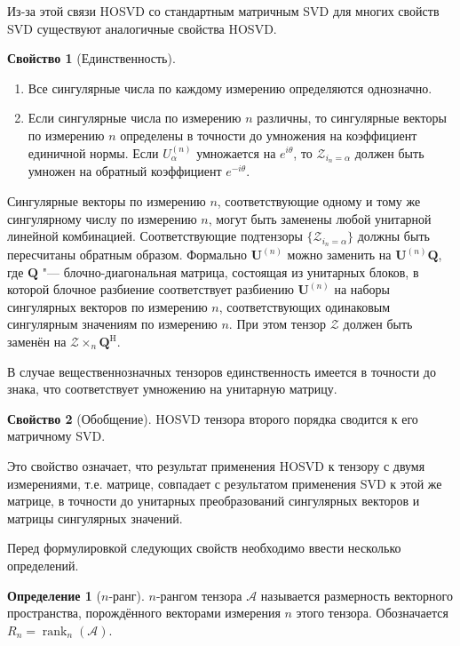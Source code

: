 \documentclass[specialist,
    substylefile = spbu_report.rtx,
    subf,href,colorlinks=true, 12pt]{disser}
\theoremstyle{plain}
\theoremstyle{definition}
\newtheorem{definition}{Определение}[section]
\newtheorem{property}{Свойство}[section]
\theoremstyle{remark}
\begin{document}
    Из-за этой связи HOSVD со стандартным матричным SVD для многих свойств SVD существуют аналогичные свойства HOSVD\@.
    \begin{property}[Единственность]
        \leavevmode
        \begin{enumerate}
            \item Все сингулярные числа по каждому измерению определяются однозначно.
            \item Если сингулярные числа по измерению $n$ различны, то сингулярные векторы по измерению $n$ определены
            в точности до умножения на коэффициент единичной нормы.
            Если $U_\alpha^{(n)}$ умножается на $e^{i\theta}$, то $\mathcal{Z}_{i_n=\alpha}$ должен быть умножен на обратный
            коэффициент $e^{-i\theta}$.
        \end{enumerate}
        Сингулярные векторы по измерению $n$, соответствующие одному и тому же сингулярному числу по измерению $n$,
        могут быть заменены любой унитарной линейной комбинацией.
        Соответствующие подтензоры $\{\mathcal{Z}_{i_n=\alpha}\}$ должны быть пересчитаны обратным образом.
        Формально $\mathbf{U}^{(n)}$ можно заменить на $\mathbf{U}^{(n)}\mathbf{Q}$, где $\mathbf{Q}$ "--- блочно-диагональная
        матрица, состоящая из унитарных блоков, в которой блочное разбиение соответствует разбиению $\mathbf{U}^{(n)}$
        на наборы сингулярных векторов по измерению $n$, соответствующих одинаковым сингулярным значениям по измерению $n$.
        При этом тензор $\mathcal{Z}$ должен быть заменён на $\mathcal{Z}\times_{n} \mathbf{Q}^{\mathrm{H}}$.

        В случае вещественнозначных тензоров единственность имеется в точности до знака, что соответствует
        умножению на унитарную матрицу.
    \end{property}

    \begin{property}[Обобщение]
        HOSVD тензора второго порядка сводится к его матричному SVD\@.
    \end{property}
    Это свойство означает, что результат применения HOSVD к тензору с двумя измерениями, т.е. матрице, совпадает
    с результатом применения SVD к этой же матрице, в точности до унитарных преобразований сингулярных векторов и
    матрицы сингулярных значений.

    Перед формулировкой следующих свойств необходимо ввести несколько определений.
    \begin{definition}[$n$-ранг]
        $n$-рангом тензора $\mathcal{A}$ называется размерность векторного пространства, порождённого векторами измерения $n$ этого тензора.
        Обозначается $R_n=\operatorname{rank}_{n}(\mathcal{A})$.
    \end{definition}
\end{document}
